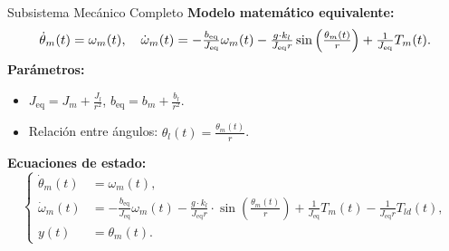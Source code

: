 \documentclass[12pt]{beamer}
\begin{document}
\begin{frame}{Subsistema Mecánico Completo}\footnotesize
    \textbf{Modelo matemático equivalente:}
    \begin{equation}
        \resizebox{0.9\hsize}{!}{$
        \dot{\theta}_m(t) = \omega_m(t), \quad
        \dot{\omega}_m(t) = -\frac{b_{\text{eq}}}{J_{\text{eq}}} \omega_m(t) 
        - \frac{g \cdot k_l}{J_{\text{eq}} r} \sin\left(\frac{\theta_m(t)}{r}\right) 
        + \frac{1}{J_{\text{eq}}} T_m(t).
        $}
    \end{equation}
    \textbf{Parámetros:}
    \begin{itemize}\footnotesize
        \item \( J_{\text{eq}} = J_m + \frac{J_l}{r^2} \), \( b_{\text{eq}} = b_m + \frac{b_l}{r^2} \).
        \item Relación entre ángulos: \( \theta_l(t) = \frac{\theta_m(t)}{r} \).
    \end{itemize}
    \textbf{Ecuaciones de estado:}
    \begin{equation}
    \left\{
    \begin{aligned}
        \dot{\theta}_m(t) &= \omega_m(t), \\
        \dot{\omega}_m(t) &= -\frac{b_{\text{eq}}}{J_{\text{eq}}} \omega_m(t) - \frac{g \cdot k_l}{J_{\text{eq}} r} \cdot \sin\left(\frac{\theta_m(t)}{r}\right) + \frac{1}{J_{\text{eq}}} T_m(t) - \frac{1}{J_{\text{eq}} r} T_{ld}(t), \\
        y(t) &= \theta_m(t).
    \end{aligned}
    \right.
    \end{equation}
\end{frame}
\end{document}

